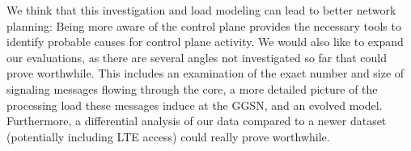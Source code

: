 We think that this investigation and load modeling can lead to better network planning: Being more aware of the control plane provides the necessary tools to identify probable causes for control plane activity. We would also like to expand our evaluations, as there are several angles not investigated so far that could prove worthwhile. This includes an examination of the exact number and size of signaling messages flowing through the core, a more detailed picture of the processing load these messages induce at the \ac{GGSN}, and an evolved model. Furthermore, a differential analysis of our data compared to a newer dataset (potentially including \ac{LTE} access) could really prove worthwhile.

